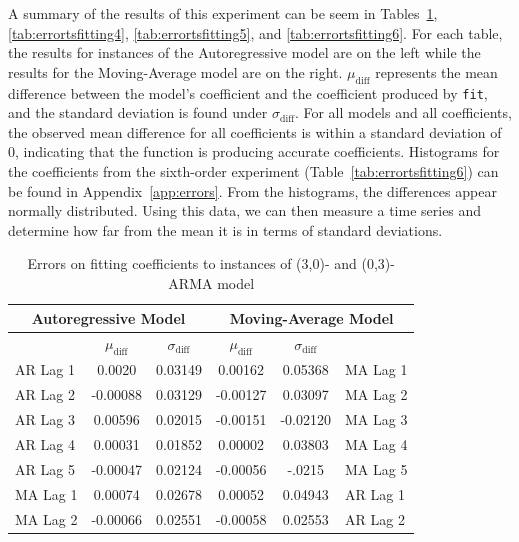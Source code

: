 \documentclass[oneside,12pt,openany]{book}
\begin{document}
    \FloatBarrier
    
     A summary of the results of this experiment can be seem in Tables~\ref{tab:errortsfitting3}, \ref{tab:errortsfitting4}, \ref{tab:errortsfitting5}, and \ref{tab:errortsfitting6}. For each table, the results for instances of the Autoregressive model are on the left while the results for the Moving-Average model are on the right. $\mu_{\text{diff}}$ represents the mean difference between the model's coefficient and the coefficient produced by \texttt{fit}, and the standard deviation is found under $\sigma_{\text{diff}}$.  For all models and all coefficients, the observed mean difference for all coefficients is within a standard deviation of 0, indicating that the function is producing accurate coefficients. Histograms for the coefficients from the sixth-order experiment (Table~\ref{tab:errortsfitting6}) can be found in Appendix~\ref{app:errors}. From the histograms, the differences appear normally distributed. Using this data, we can then measure a time series and determine how far from the mean it is in terms of standard deviations. 
    
    \begin{table}[hbt!]
        \centering
        \begin{tabular}{|l|c|c|c|c|l|}
            \hline
            \multicolumn{3}{|c|}{Autoregressive Model} & \multicolumn{3}{c|}{Moving-Average Model} \\ \hline
            \cellcolor{black} & $\mu_{\text{diff}}$ & $\sigma_{\text{diff}}$ & $\mu_{\text{diff}}$ & $\sigma_{\text{diff}}$ &  \cellcolor{black} \\ \hline
            AR Lag 1 & 0.0020 & 0.03149 & 0.00162 & 0.05368 & MA Lag 1 \\ \hline
            AR Lag 2 & -0.00088 & 0.03129 & -0.00127 & 0.03097 & MA Lag 2 \\ \hline
            AR Lag 3 & 0.00596 & 0.02015 & -0.00151 & -0.02120 & MA Lag 3 \\ \hline
            AR Lag 4 & 0.00031 & 0.01852 & 0.00002 & 0.03803 & MA Lag 4 \\ \hline
            AR Lag 5 & -0.00047 & 0.02124 & -0.00056 & -.0215 & MA Lag 5 \\ \hline
            MA Lag 1 & 0.00074 & 0.02678 & 0.00052 & 0.04943 & AR Lag 1 \\ \hline
            MA Lag 2 & -0.00066 & 0.02551 & -0.00058 & 0.02553 & AR Lag 2 \\ \hline
        \end{tabular}
        \caption{Errors on fitting coefficients to instances of (3,0)- and (0,3)-ARMA model}
        \label{tab:errortsfitting3}
    \end{table}
    
\end{document}
